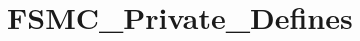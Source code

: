 \hypertarget{group___f_s_m_c___private___defines}{\section{F\-S\-M\-C\-\_\-\-Private\-\_\-\-Defines}
\label{group___f_s_m_c___private___defines}
}

